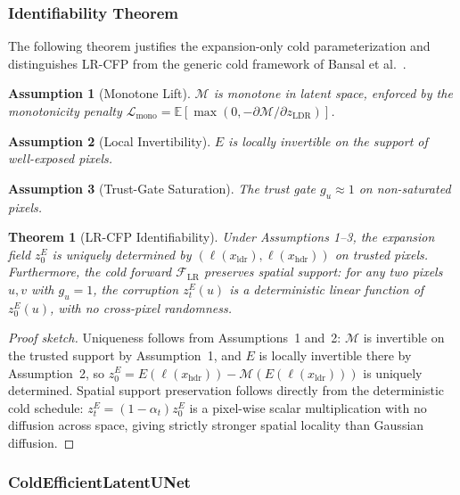 \documentclass[10pt,twocolumn,letterpaper]{article}
\newtheorem{theorem}{Theorem}
\newtheorem{assumption}{Assumption}
\newcommand{\xhdr}{x_{\mathrm{hdr}}}
\newcommand{\xldr}{x_{\mathrm{ldr}}}
\begin{document}
\subsubsection{Identifiability Theorem}
\label{sec:theorem}

The following theorem justifies the expansion-only cold parameterization and distinguishes LR-CFP from the generic cold framework of Bansal et al.~\cite{colddiffusion}.

\begin{assumption}[Monotone Lift]
$\mathcal{M}$ is monotone in latent space, enforced by the monotonicity penalty $\mathcal{L}_{\mathrm{mono}} = \mathbb{E}[\max(0, -\partial \mathcal{M}/\partial z_{\mathrm{LDR}})]$.
\end{assumption}

\begin{assumption}[Local Invertibility]
$E$ is locally invertible on the support of well-exposed pixels.
\end{assumption}

\begin{assumption}[Trust-Gate Saturation]
The trust gate $g_u \approx 1$ on non-saturated pixels.
\end{assumption}

\begin{theorem}[LR-CFP Identifiability]
\label{thm:identifiability}
Under Assumptions 1--3, the expansion field $z_0^{E}$ is uniquely determined by $(\ell(\xldr), \ell(\xhdr))$ on trusted pixels. Furthermore, the cold forward $\mathcal{F}_{\mathrm{LR}}$ preserves spatial support: for any two pixels $u, v$ with $g_u=1$, the corruption $z_t^{E}(u)$ is a deterministic linear function of $z_0^{E}(u)$, with no cross-pixel randomness.
\end{theorem}

\begin{proof}[Proof sketch]
Uniqueness follows from Assumptions~1 and~2: $\mathcal{M}$ is invertible on the trusted support by Assumption~1, and $E$ is locally invertible there by Assumption~2, so $z_0^{E} = E(\ell(\xhdr)) - \mathcal{M}(E(\ell(\xldr)))$ is uniquely determined. Spatial support preservation follows directly from the deterministic cold schedule: $z_t^{E} = (1-\alpha_t) z_0^{E}$ is a pixel-wise scalar multiplication with no diffusion across space, giving strictly stronger spatial locality than Gaussian diffusion.
\end{proof}

\subsubsection{ColdEfficientLatentUNet}
\end{document}
